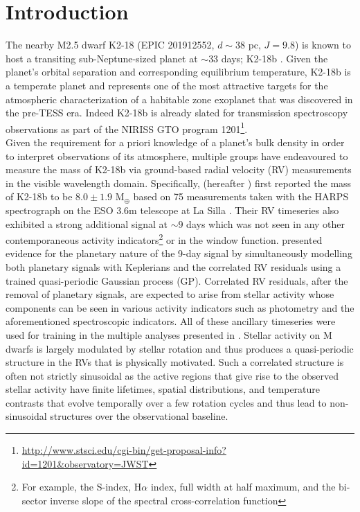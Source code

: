 
\section{Introduction}
The nearby M2.5 dwarf K2-18 (EPIC 201912552, $d\sim 38$ pc, $J=9.8$)
is known to host a transiting sub-Neptune-sized planet 
at $\sim 33$ days; K2-18b \citep{foremanmackey15b,montet15,benneke17}. Given the planet's orbital separation
and corresponding equilibrium temperature, K2-18b is a temperate planet and represents one of the
most attractive targets for the atmospheric characterization of a habitable zone exoplanet 
that was discovered in the pre-TESS era. Indeed K2-18b is already slated for transmission
spectroscopy observations as part of the NIRISS GTO program
1201\footnote{\url{http://www.stsci.edu/cgi-bin/get-proposal-info?id=1201&observatory=JWST}}. \\

Given the requirement for a priori knowledge of a planet's bulk density in order to interpret
observations of its atmosphere, multiple groups have endeavoured to
measure the mass of K2-18b via ground-based radial velocity (RV) measurements in the visible
wavelength domain. Specifically, \cite{cloutier17b} (hereafter )
first reported the mass of K2-18b to be
$8.0\pm 1.9$ M$_{\oplus}$ based on 75 measurements taken with the HARPS spectrograph on the ESO 3.6m
telescope at La Silla  \citep{mayor03}. 
Their RV timeseries also exhibited a strong additional signal
at $\sim 9$ days which was not seen in any other contemporaneous activity indicators\footnote{For example,  the
  S-index, H$\alpha$ index, full width at half maximum, and the bi-sector inverse slope of the spectral
  cross-correlation function} or in the window function.
 presented evidence for the
planetary nature of the 9-day signal by simultaneously modelling both planetary signals with Keplerians
and the correlated RV residuals using a trained quasi-periodic Gaussian process (GP).
Correlated RV residuals, after the removal of planetary signals, are expected to arise from
stellar activity whose components can be seen in various activity indicators such as
photometry and the aforementioned spectroscopic indicators. All of these ancillary timeseries were used
for training in the multiple analyses presented in .
Stellar activity on M dwarfs is largely modulated by stellar rotation \citep{boisse11}
and thus produces a quasi-periodic structure in the RVs that is physically motivated.
Such a correlated structure is often not strictly sinusoidal as the
active regions that give rise to the observed stellar activity have finite lifetimes, spatial
distributions, and temperature contrasts that evolve temporally over a
few rotation cycles and thus lead to non-sinusoidal structures over the observational baseline. \\

